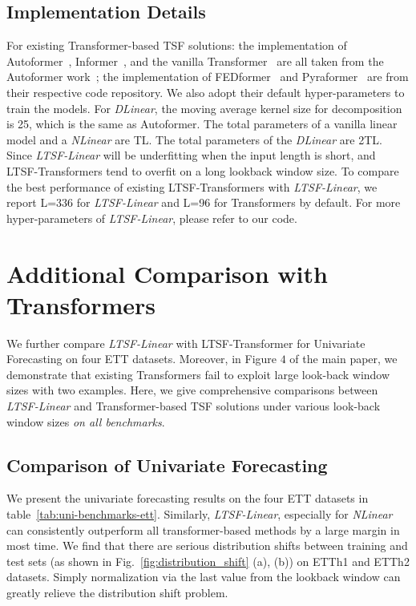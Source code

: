 \documentclass[10pt,twocolumn,letterpaper]{article}
\newcommand{\modelname}{\emph{LTSF-Linear}\xspace}
\begin{document}
\subsection{Implementation Details}
For existing Transformer-based TSF solutions: the implementation of Autoformer~\cite{xu2021autoformer}, Informer~\cite{informer}, and the vanilla Transformer~\cite{vaswani2017attention} are all taken from the Autoformer work~\cite{xu2021autoformer}; the implementation of FEDformer~\cite{zhou2022fedformer} and Pyraformer~\cite{liu2021pyraformer} are from their respective code repository. We also adopt their default hyper-parameters to train the models. For \emph{DLinear}, the moving average kernel size for decomposition is 25, which is the same as Autoformer. The total parameters of a vanilla linear model and a \emph{NLinear} are T\*L. The total parameters of the \emph{DLinear} are 2\*T\*L. Since \modelname will be underfitting when the input length is short, and LTSF-Transformers tend to overfit on a long lookback window size. To compare the best performance of existing LTSF-Transformers with \modelname, we report L=336 for \modelname and L=96 for Transformers by default. For more hyper-parameters of \modelname, please refer to our code.



\section{Additional Comparison with Transformers}
\label{sec:supp_add}
We further compare \modelname with LTSF-Transformer for  Univariate Forecasting on four ETT datasets. Moreover, in Figure $4$ of the main paper, we demonstrate that existing Transformers fail to exploit large look-back window sizes with two examples. Here, we give comprehensive comparisons between \modelname and Transformer-based TSF solutions under various look-back window sizes \emph{on all benchmarks}.




\subsection{Comparison of Univariate Forecasting}

We present the univariate forecasting results on the four ETT datasets in table~\ref{tab:uni-benchmarks-ett}. Similarly, \modelname, especially for \emph{NLinear} can consistently outperform all transformer-based methods by a large margin in most time. We find that there are serious distribution shifts between training and test sets (as shown in Fig.~\ref{fig:distribution_shift} (a), (b)) on ETTh1 and ETTh2 datasets. Simply normalization via the last value from the lookback window can greatly relieve the distribution shift problem.
\end{document}
